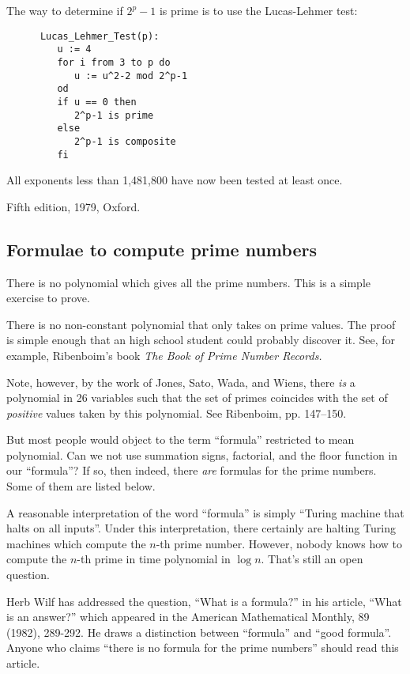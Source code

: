 \bigskip
\bigskip

The way to determine if $2^p-1$ is prime is to use the Lucas-Lehmer
test:

\begin{verbatim}
      Lucas_Lehmer_Test(p):
         u := 4
         for i from 3 to p do
            u := u^2-2 mod 2^p-1
         od
         if u == 0 then
            2^p-1 is prime
         else
            2^p-1 is composite
         fi
\end{verbatim}

All exponents less than 1,481,800 have now been tested at least once.

\Ref

  {Fifth edition, 1979, Oxford.}
 
\subsection{Formulae to compute prime numbers}


There is no polynomial which gives all the prime numbers. This is a
simple exercise to prove.

There is no non-constant polynomial that only takes on prime values.
The proof is simple enough that an high school student could probably
discover it.  See, for example, Ribenboim's book {\it The Book of Prime
  Number Records.}

Note, however, by the work of Jones, Sato, Wada, and Wiens, there {\it
  is} a polynomial in 26 variables such that the set of primes coincides
with the set of {\it positive} values taken by this polynomial.  See
Ribenboim, pp. 147--150.

But most people would object to the term ``formula'' restricted to mean
polynomial.  Can we not use summation signs, factorial, and the floor
function in our ``formula''?  If so, then indeed, there {\it are}
formulas for the prime numbers.  Some of them are listed below.

A reasonable interpretation of the word ``formula'' is simply ``Turing
machine that halts on all inputs''.  Under this interpretation, there
certainly are halting Turing machines which compute the $n$-th prime
number.  However, nobody knows how to compute the $n$-th prime in time
polynomial in $\log n$.  That's still an open question.

Herb Wilf has addressed the question, ``What is a formula?'' in his
article, ``What is an answer?'' which appeared in the American
Mathematical Monthly, 89 (1982), 289-292.  He draws a distinction
between ``formula'' and ``good formula''.  Anyone who claims ``there is
no formula for the prime numbers'' should read this article.

